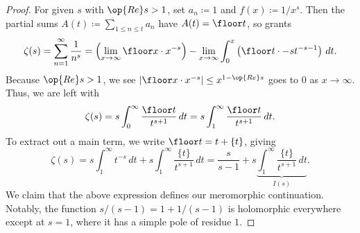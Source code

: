 \documentclass[../notes.tex]{subfiles}
\begin{document}
\begin{proof}
	For given $s$ with $\op{Re}s>1$, set $a_n\coloneqq1$ and $f(x)\coloneqq1/x^s$. Then the partial sums $A(t)\coloneqq\sum_{1\le n\le t}a_n$ have $A(t)=\floor t$, so  grants
	\[\zeta(s)=\sum_{n=1}^\infty\frac1{n^s}=\left(\lim_{x\to\infty}\floor x\cdot x^{-s}\right)-\lim_{x\to\infty}\int_0^x\left(\floor t\cdot -st^{-s-1}\right)\,dt.\]
	Because $\op{Re}s>1$, we see $\left|\floor x\cdot x^{-s}\right|\le x^{1-\op{Re}s}$ goes to $0$ as $x\to\infty$. Thus, we are left with
	\[\zeta(s)=s\int_0^\infty\frac{\floor t}{t^{s+1}}\,dt=s\int_1^\infty\frac{\floor t}{t^{s+1}}\,dt.\]
	To extract out a main term, we write $\floor t=t+\{t\}$, giving
	\[\zeta(s)=s\int_1^\infty t^{-s}\,dt+s\int_1^\infty\frac{\{t\}}{t^{s+1}}\,dt=\frac s{s-1}+s\underbrace{\int_1^\infty\frac{\{t\}}{t^{s+1}}\,dt}_{I(s)}.\]
	We claim that the above expression defines our meromorphic continuation. Notably, the function $s/(s-1)=1+1/(s-1)$ is holomorphic everywhere except at $s=1$, where it has a simple pole of residue $1$.


\end{proof}
\end{document}

